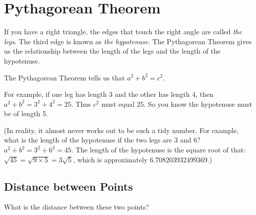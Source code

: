 \chapter{Pythagorean Theorem}

If you have a right triangle, the edges that touch the right angle are
called \emph{the legs}.  The third edge is known as \emph{the
  hypotenuse}. The Pythagorean Theorem gives us the relationship
between the length of the legs and the length of the hypotenuse.


The Pythagorean Theorem tells us that $a^2 + b^2 = c^2$.

For example, if one leg has length 3 and the other has length 4, then
$a^2 + b^2 = 3^2 + 4^2 = 25$. Thus $c^2$ must equal 25. So you know
the hypotenuse must be of length 5.

(In reality, it almost never works out to be such a tidy number. For
example, what is the length of the hypotenuse if the two legs are 3
and 6? $a^2 + b^2 = 3^2 + 6^2 = 45$.  The length of the hypotenuse is
the square root of that: $\sqrt{45} = \sqrt{9 \times 5} = 3 \sqrt{5}$,
which is approximately 6.708203932499369.)

\section{Distance between Points}

What is the distance between these two points?


